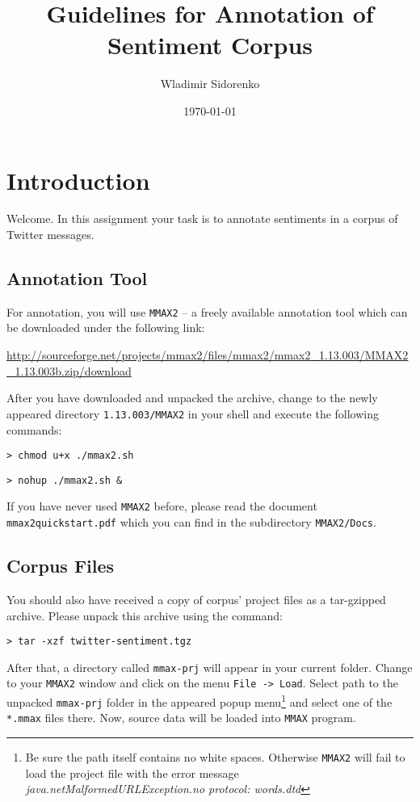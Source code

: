 \documentclass[11pt,a4paper]{article}
\author{Wladimir Sidorenko}
\date{\today}
\title{Guidelines for Annotation of Sentiment Corpus}
\begin{document}
\maketitle{}
\section{Introduction}
Welcome. In this assignment your task is to annotate sentiments in a
corpus of Twitter messages.

\subsection{Annotation Tool}

For annotation, you will use \texttt{MMAX2} -- a freely available
annotation tool which can be downloaded under the following link:

\url{http://sourceforge.net/projects/mmax2/files/mmax2/mmax2_1.13.003/MMAX2_1.13.003b.zip/download}

After you have downloaded and unpacked the archive, change to the
newly appeared directory \texttt{1.13.003/MMAX2} in your shell and
execute the following commands:

\texttt{> chmod u+x ./mmax2.sh}

\texttt{> nohup ./mmax2.sh \&}

{\setlength{\parindent}{0pt} If you have never used \texttt{MMAX2}
  before, please read the document \texttt{mmax2quickstart.pdf} which
  you can find in the subdirectory \texttt{MMAX2/Docs}.}

\subsection{Corpus Files}

You should also have received a copy of corpus' project files as a
tar-gzipped archive.  Please unpack this archive using the
command:

\texttt{> tar -xzf twitter-sentiment.tgz}

{\setlength{\parindent}{0pt} After that, a directory called
  \texttt{mmax-prj} will appear in your current folder.  Change to
  your \texttt{MMAX2} window and click on the menu \texttt{File ->
    Load}.  Select path to the unpacked \texttt{mmax-prj} folder in
  the appeared popup menu\footnote{Be sure the path itself contains no
    white spaces. Otherwise \texttt{MMAX2} will fail to load the
    project file with the error message
    \emph{java.netMalformedURLException.no protocol: words.dtd}} and
  select one of the \texttt{*.mmax} files there. Now, source data will
  be loaded into \texttt{MMAX} program.}
\end{document}
